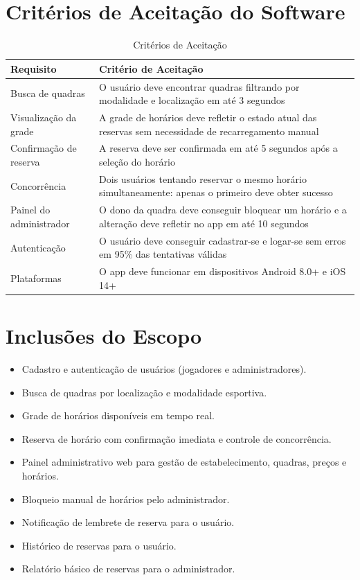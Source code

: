 \documentclass[12pt,a4paper,oneside]{report}
\begin{document}
\section{Critérios de Aceitação do Software}

\begin{table}[htbp]
\centering
\caption{Critérios de Aceitação}
\begin{tabular}{p{3.5cm} p{10cm}}
\toprule
\textbf{Requisito} & \textbf{Critério de Aceitação} \\
\midrule
Busca de quadras & O usuário deve encontrar quadras filtrando por modalidade e localização em até 3 segundos \\
Visualização da grade & A grade de horários deve refletir o estado atual das reservas sem necessidade de recarregamento manual \\
Confirmação de reserva & A reserva deve ser confirmada em até 5 segundos após a seleção do horário \\
Concorrência & Dois usuários tentando reservar o mesmo horário simultaneamente: apenas o primeiro deve obter sucesso \\
Painel do administrador & O dono da quadra deve conseguir bloquear um horário e a alteração deve refletir no app em até 10 segundos \\
Autenticação & O usuário deve conseguir cadastrar-se e logar-se sem erros em 95\% das tentativas válidas \\
Plataformas & O app deve funcionar em dispositivos Android 8.0+ e iOS 14+ \\
\bottomrule
\end{tabular}
\end{table}

\section{Inclusões do Escopo}

\begin{itemize}
    \item Cadastro e autenticação de usuários (jogadores e administradores).
    \item Busca de quadras por localização e modalidade esportiva.
    \item Grade de horários disponíveis em tempo real.
    \item Reserva de horário com confirmação imediata e controle de concorrência.
    \item Painel administrativo web para gestão de estabelecimento, quadras, preços e horários.
    \item Bloqueio manual de horários pelo administrador.
    \item Notificação de lembrete de reserva para o usuário.
    \item Histórico de reservas para o usuário.
    \item Relatório básico de reservas para o administrador.
\end{itemize}
\end{document}
